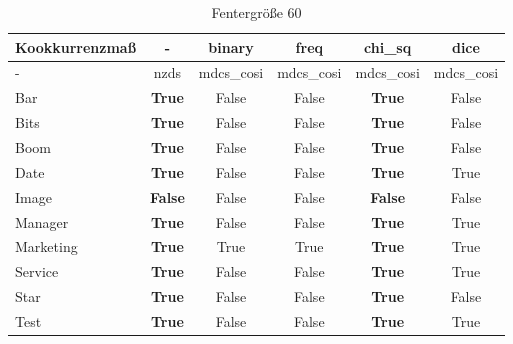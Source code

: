 \documentclass[11pt,numbers=noenddot]{scrartcl}
\begin{document}
\begin{table}[h]
    \begin{center}
        \begin{tabular}{ l | *{5}{c}  }
            Kookkurrenzmaß & - & binary & freq & chi\_sq & dice \\ \hline
               -      & nzds   &  mdcs\_cosi & mdcs\_cosi & mdcs\_cosi & mdcs\_cosi  \\ \hline
            Bar      &  \textbf{True}   &  False     &   False   &  \textbf{True}  & False    \\
            Bits     &  \textbf{True}   &  False     &   False   &  \textbf{True}   & False    \\
            Boom     &  \textbf{True}   &  False     &   False   &  \textbf{True}   & False    \\
            Date     &  \textbf{True}   &  False     &   False   &  \textbf{True}   & True   \\
            Image    &  \textbf{False}  &  False     &   False   &  \textbf{False}  & False   \\
            Manager  &  \textbf{True}   &  False     &   False   &  \textbf{True}   & True  \\
            Marketing&  \textbf{True}   &  True      &   True    &  \textbf{True}   & True   \\
            Service  &  \textbf{True}   &  False     &   False   &  \textbf{True}   & True   \\
            Star     &  \textbf{True}   &  False     &   False   &  \textbf{True}   & False  \\
            Test     &  \textbf{True}   &  False     &   False   &  \textbf{True}  & True
        \end{tabular}
    \end{center}
    \caption{Fentergröße 60}
\end{table}
\end{document}
